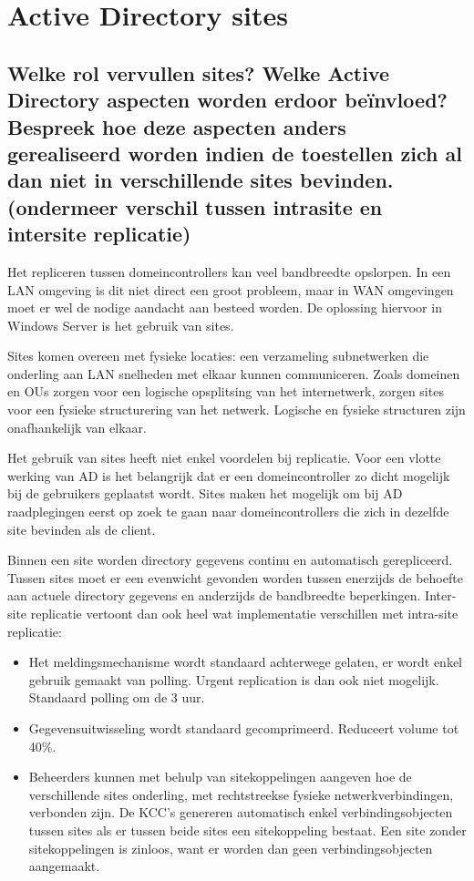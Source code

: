 \chapter{Active Directory sites}

\section{Welke rol vervullen sites? Welke Active Directory aspecten worden
erdoor beïnvloed? Bespreek hoe deze aspecten anders gerealiseerd worden indien
de toestellen zich al dan niet in verschillende sites bevinden. (ondermeer
verschil tussen intrasite en intersite replicatie)}

Het repliceren tussen domeincontrollers kan veel bandbreedte opslorpen. In een
LAN omgeving is dit niet direct een groot probleem, maar in WAN omgevingen moet
er wel de nodige aandacht aan besteed worden. De oplossing hiervoor in Windows
Server is het gebruik van sites.

Sites komen overeen met fysieke locaties: een verzameling subnetwerken die
onderling aan LAN snelheden met elkaar kunnen communiceren. Zoals domeinen en
OUs zorgen voor een logische opsplitsing van het internetwerk, zorgen sites voor
een fysieke structurering van het netwerk. Logische en fysieke structuren zijn
onafhankelijk van elkaar.

Het gebruik van sites heeft niet enkel voordelen bij replicatie. Voor een vlotte
werking van AD is het belangrijk dat er een domeincontroller zo dicht mogelijk
bij de gebruikers geplaatst wordt. Sites maken het mogelijk om bij AD
raadplegingen eerst op zoek te gaan naar domeincontrollers die zich in dezelfde
site bevinden als de client.

Binnen een site worden directory gegevens continu en automatisch gerepliceerd.
Tussen sites moet er een evenwicht gevonden worden tussen enerzijds de behoefte
aan actuele directory gegevens en anderzijds de bandbreedte beperkingen.
Inter-site replicatie vertoont dan ook heel wat implementatie verschillen met
intra-site replicatie:
\begin{itemize}
	\item Het meldingsmechanisme wordt standaard achterwege gelaten, er
		wordt enkel gebruik gemaakt van polling. Urgent replication is
		dan ook niet mogelijk. Standaard polling om de 3 uur.
	\item Gegevensuitwisseling wordt standaard gecomprimeerd. Reduceert
		volume tot 40\%.
	\item Beheerders kunnen met behulp van sitekoppelingen aangeven hoe de
		verschillende sites onderling, met rechtstreekse fysieke
		netwerkverbindingen, verbonden zijn. De KCC's genereren
		automatisch enkel verbindingsobjecten tussen sites als er tussen
		beide sites een sitekoppeling bestaat. Een site zonder
		sitekoppelingen is zinloos, want er worden dan geen
		verbindingsobjecten aangemaakt.
\end{itemize}

